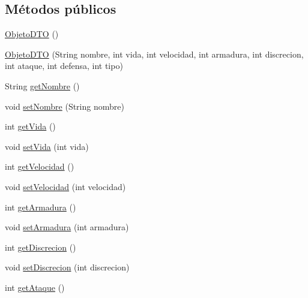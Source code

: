 \subsection*{Métodos públicos}
\begin{DoxyCompactItemize}
\item 
\hyperlink{classes_1_1deusto_1_1spq_1_1_t_e_scc_1_1dto_1_1_objeto_d_t_o_aa1be37cc6bcfea6262277805b9a358cd}{Objeto\+D\+T\+O} ()
\item 
\hyperlink{classes_1_1deusto_1_1spq_1_1_t_e_scc_1_1dto_1_1_objeto_d_t_o_a89ac6a0ecc4bb8683f87a8561a57ddf6}{Objeto\+D\+T\+O} (String nombre, int vida, int velocidad, int armadura, int discrecion, int ataque, int defensa, int tipo)
\item 
String \hyperlink{classes_1_1deusto_1_1spq_1_1_t_e_scc_1_1dto_1_1_objeto_d_t_o_ab8983399197e801752788616f00a09ef}{get\+Nombre} ()
\item 
void \hyperlink{classes_1_1deusto_1_1spq_1_1_t_e_scc_1_1dto_1_1_objeto_d_t_o_ae4f3e851d72520f1eba75288194f5174}{set\+Nombre} (String nombre)
\item 
int \hyperlink{classes_1_1deusto_1_1spq_1_1_t_e_scc_1_1dto_1_1_objeto_d_t_o_ae9dddc85090e9b2e97cb5e45183a2083}{get\+Vida} ()
\item 
void \hyperlink{classes_1_1deusto_1_1spq_1_1_t_e_scc_1_1dto_1_1_objeto_d_t_o_ab193f51c96306655ec3b98c8271a0663}{set\+Vida} (int vida)
\item 
int \hyperlink{classes_1_1deusto_1_1spq_1_1_t_e_scc_1_1dto_1_1_objeto_d_t_o_aa399533d158af00e033d34bbeea77894}{get\+Velocidad} ()
\item 
void \hyperlink{classes_1_1deusto_1_1spq_1_1_t_e_scc_1_1dto_1_1_objeto_d_t_o_af0f8da71d101b6921a12e4cb62c8c457}{set\+Velocidad} (int velocidad)
\item 
int \hyperlink{classes_1_1deusto_1_1spq_1_1_t_e_scc_1_1dto_1_1_objeto_d_t_o_a1c46cf2e6eb9fa99f2859a595eabe05f}{get\+Armadura} ()
\item 
void \hyperlink{classes_1_1deusto_1_1spq_1_1_t_e_scc_1_1dto_1_1_objeto_d_t_o_a1c3df3dfb4d29bfd107c86d03dcbaa94}{set\+Armadura} (int armadura)
\item 
int \hyperlink{classes_1_1deusto_1_1spq_1_1_t_e_scc_1_1dto_1_1_objeto_d_t_o_a6cb85a844caba13fc84d3a48f73b741d}{get\+Discrecion} ()
\item 
void \hyperlink{classes_1_1deusto_1_1spq_1_1_t_e_scc_1_1dto_1_1_objeto_d_t_o_aaaf5cbe94c9cb8faa564fb5afe3a9788}{set\+Discrecion} (int discrecion)
\item 
int \hyperlink{classes_1_1deusto_1_1spq_1_1_t_e_scc_1_1dto_1_1_objeto_d_t_o_a17853421f52302f9978726221377b6c5}{get\+Ataque} ()

\end{DoxyCompactItemize}
